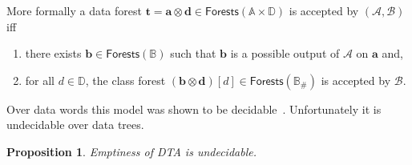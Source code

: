 \documentclass{CSML}
\newtheorem{proposition}[theorem]{Proposition}
\newcommand\wdad{\textup{DTA}\xspace}
\newcommand\A{\ensuremath{\mathbb{A}}\xspace}
\newcommand\B{\mathbb{B}}
\newcommand\D{\mathbb{D}}
\newcommand\Aa{\mathcal{A}}
\newcommand\Ba{\mathcal{B}}
\newcommand\Forests{\mathsf{Forests}}
\newcommand\tree{\boldsymbol{t}}
\newcommand\atree{\boldsymbol{a}}
\newcommand\btree{\boldsymbol{b}}
\newcommand\dtree{\boldsymbol{d}}
\begin{document}
More formally a data forest $\tree=\atree\otimes\dtree \in \Forests(\A\times\D)$ 
is accepted by $(\Aa,\Ba)$ iff
\begin{enumerate}
\item there exists $\btree \in \Forests(\B)$ such that
$\btree$ is a possible output of $\Aa$ on $\atree$ and,
\item for all $d\in\D$, 
      the class forest $(\btree\otimes\dtree)[d] \in \Forests(\B_\#)$ is accepted by $\Ba$.
\end{enumerate}

\noindent
Over data words this model was shown to be decidable~\cite{BDMSS11}. 
Unfortunately it is undecidable over data trees.
\begin{proposition}\label{prop-undecid}
Emptiness of \wdad is undecidable.
\end{proposition}
\end{document}

